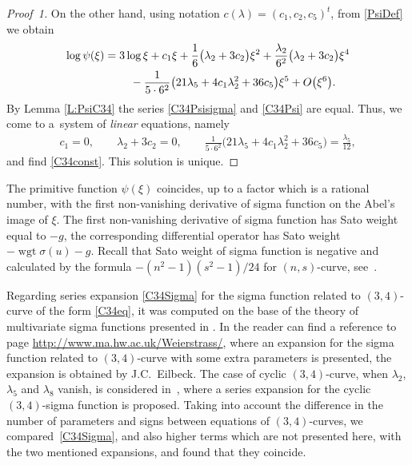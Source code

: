\documentclass[11pt]{article}
\numberwithin{equation}{section}
\DeclareMathOperator{\wgt}{wgt}
\begin{document}
\begin{proof}[Proof~1]
On the other hand, using notation $c(\lambda)=(c_1,c_2,c_5)^t$, from \eqref{PsiDef} we obtain
\begin{gather}
 \log \psi(\xi) = 3 \log \xi + c_1 \xi + \frac{1}{6} \big(\lambda_2+3c_2 \big) \xi^2
 + \frac{\lambda_2}{6^2} \big(\lambda_2+3 c_2 \big) \xi^4\nonumber\\
 \hphantom{\log \psi(\xi) =}{} - \frac{1}{5\cdot 6^2} \big(21\lambda_5 +4 c_1 \lambda_2^2 + 36 c_5\big)\xi^5 + O\big(\xi^6\big).\label{C34Psi}
\end{gather}
By Lemma \ref{L:PsiC34} the series \eqref{C34Psisigma} and \eqref{C34Psi} are equal. Thus, we come to a~system of \emph{linear} equations, namely
\begin{gather*}
 c_1 = 0,\qquad \lambda_2+3c_2 =0,\qquad \frac{1}{5\cdot 6^2} \big(21\lambda_5 + 4 c_1 \lambda_2^2 + 36 c_5\big)= \frac{\lambda_5}{12},
\end{gather*}
and find \eqref{C34const}. {This solution is unique.}
\end{proof}

\begin{Remark}\label{R:SigmaDer} The primitive function $\psi(\xi)$ coincides, up to a factor which is a rational number, with the first non-vanishing derivative of sigma function on the Abel's image of $\xi$. The first non-vanishing derivative of sigma function has Sato weight equal to $-g$, the corresponding differential operator has Sato weight $-\wgt \sigma (u)-g$. Recall that Sato weight of sigma function is negative and calculated by the formula $-(n^2-1)(s^2-1)/24$ for $(n,s)$-curve, see~\cite{BEL1999}.
\end{Remark}
\begin{Remark}\label{R:SigmaExpansion}
Regarding series expansion \eqref{C34Sigma} for the sigma function related to $(3,4)$-curve of the form \eqref{C34eq}, it was computed on the base of the theory of multivariate sigma functions presented in \cite{BL2004,BL2008}. In \cite[ref.~15]{EEMOP2007} the reader can find a reference to page \url{http://www.ma.hw.ac.uk/Weierstrass/}, where an expansion for the sigma function related to $(3,4)$-curve with some extra parameters is presented, the expansion is obtained by J.C.~Eilbeck. The case of cyclic $(3,4)$-curve, when $\lambda_2$, $\lambda_5$ and $\lambda_8$ vanish, is considered in~\cite{EEMOP2007}, %
where a series expansion for the cyclic $(3,4)$-sigma function is proposed. Taking into account the difference in the number of parameters and signs between equations of $(3,4)$-curves, we compared~\eqref{C34Sigma}, and also higher terms which are not presented here, with the two mentioned expansions, and found that they coincide.
\end{Remark}
\end{document}
